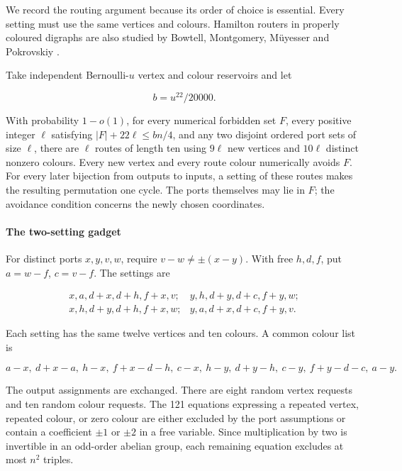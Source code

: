 \documentclass[11pt,a4paper]{article}
\begin{document}
We record the routing argument because its order of choice is essential. Every setting must use the same vertices and colours. Hamilton routers in properly coloured digraphs are also studied by Bowtell, Montgomery, Müyesser and Pokrovskiy \cite[Section 3]{BMMP26}.

Take independent Bernoulli-\(u\) vertex and colour reservoirs and let

\[
b=u^{22}/20000.
\]

With probability \(1-o(1)\), for every numerical forbidden set \(F\), every positive integer \(\ell\) satisfying \(|F|+22\ell\le bn/4\), and any two disjoint ordered port sets of size \(\ell\), there are \(\ell\) routes of length ten using \(9\ell\) new vertices and \(10\ell\) distinct nonzero colours. Every new vertex and every route colour numerically avoids \(F\). For every later bijection from outputs to inputs, a setting of these routes makes the resulting permutation one cycle. The ports themselves may lie in \(F\); the avoidance condition concerns the newly chosen coordinates.

\hypertarget{the-two-setting-gadget}{%
\paragraph{The two-setting gadget}\label{the-two-setting-gadget}}

For distinct ports \(x,y,v,w\), require \(v-w\ne\pm(x-y)\). With free \(h,d,f\), put \(a=w-f\), \(c=v-f\). The settings are

\begin{equation}
\begin{array}{ll}
x,a,d+x,d+h,f+x,v;&y,h,d+y,d+c,f+y,w;\\
x,h,d+y,d+h,f+x,w;&y,a,d+x,d+c,f+y,v.
\end{array}
\tag{PF2}\label{eq:PF2}
\end{equation}

Each setting has the same twelve vertices and ten colours. A common colour list is

\begin{equation}
a-x,\ d+x-a,\ h-x,\ f+x-d-h,\ c-x,
\ h-y,\ d+y-h,\ c-y,\ f+y-d-c,\ a-y.
\tag{PF3}\label{eq:PF3}
\end{equation}

The output assignments are exchanged. There are eight random vertex requests and ten random colour requests. The 121 equations expressing a repeated vertex, repeated colour, or zero colour are either excluded by the port assumptions or contain a coefficient \(\pm1\) or \(\pm2\) in a free variable. Since multiplication by two is invertible in an odd-order abelian group, each remaining equation excludes at most \(n^2\) triples.
\end{document}
